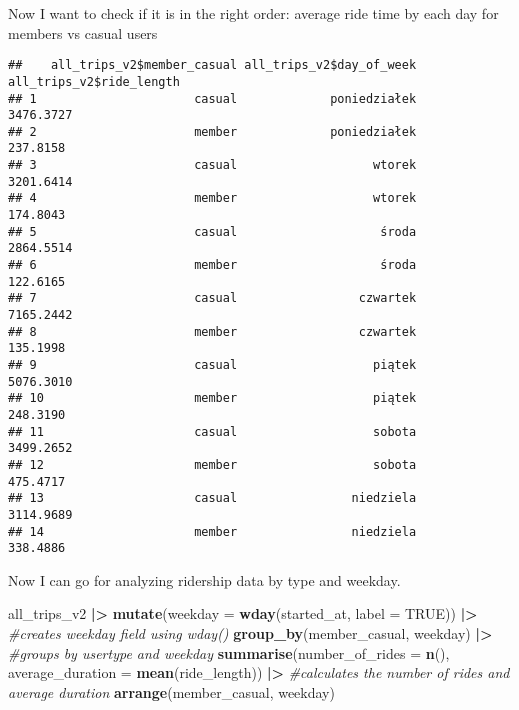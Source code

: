 \documentclass[
]{article}
\newenvironment{Shaded}{\begin{snugshade}}{\end{snugshade}}
\newcommand{\AttributeTok}[1]{\textcolor[rgb]{0.13,0.29,0.53}{#1}}
\newcommand{\CommentTok}[1]{\textcolor[rgb]{0.56,0.35,0.01}{\textit{#1}}}
\newcommand{\ConstantTok}[1]{\textcolor[rgb]{0.56,0.35,0.01}{#1}}
\newcommand{\FunctionTok}[1]{\textcolor[rgb]{0.13,0.29,0.53}{\textbf{#1}}}
\newcommand{\NormalTok}[1]{#1}
\newcommand{\SpecialCharTok}[1]{\textcolor[rgb]{0.81,0.36,0.00}{\textbf{#1}}}
\begin{document}
Now I want to check if it is in the right order: average ride time by
each day for members vs casual users

\begin{Shaded}
\end{Shaded}

\begin{verbatim}
##    all_trips_v2$member_casual all_trips_v2$day_of_week all_trips_v2$ride_length
## 1                      casual             poniedziałek                3476.3727
## 2                      member             poniedziałek                 237.8158
## 3                      casual                   wtorek                3201.6414
## 4                      member                   wtorek                 174.8043
## 5                      casual                    środa                2864.5514
## 6                      member                    środa                 122.6165
## 7                      casual                 czwartek                7165.2442
## 8                      member                 czwartek                 135.1998
## 9                      casual                   piątek                5076.3010
## 10                     member                   piątek                 248.3190
## 11                     casual                   sobota                3499.2652
## 12                     member                   sobota                 475.4717
## 13                     casual                niedziela                3114.9689
## 14                     member                niedziela                 338.4886
\end{verbatim}

Now I can go for analyzing ridership data by type and weekday.

\begin{Shaded}
\begin{Highlighting}[]
\NormalTok{all\_trips\_v2 }\SpecialCharTok{|\textgreater{}} 
  \FunctionTok{mutate}\NormalTok{(}\AttributeTok{weekday =} \FunctionTok{wday}\NormalTok{(started\_at, }\AttributeTok{label =} \ConstantTok{TRUE}\NormalTok{)) }\SpecialCharTok{|\textgreater{}} \CommentTok{\#creates weekday field using wday()}
  \FunctionTok{group\_by}\NormalTok{(member\_casual, weekday) }\SpecialCharTok{|\textgreater{}} \CommentTok{\#groups by usertype and weekday}
  \FunctionTok{summarise}\NormalTok{(}\AttributeTok{number\_of\_rides =} \FunctionTok{n}\NormalTok{(), }\AttributeTok{average\_duration =} \FunctionTok{mean}\NormalTok{(ride\_length)) }\SpecialCharTok{|\textgreater{}} \CommentTok{\#calculates the number of rides and average duration}
  \FunctionTok{arrange}\NormalTok{(member\_casual, weekday)}
\end{Highlighting}
\end{Shaded}
\end{document}
